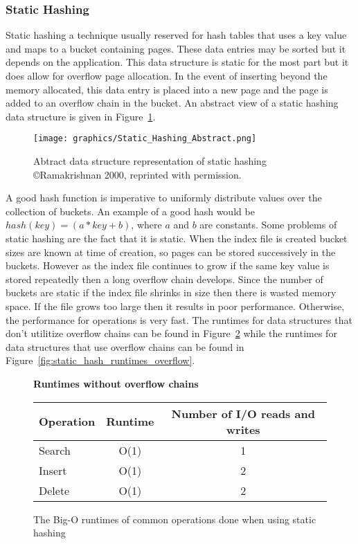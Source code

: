 \documentclass[letterpaper, 12pt]{article}
\begin{document}
\subsubsection{Static Hashing}
Static hashing a technique usually reserved for hash tables that uses a key value and maps to a bucket containing pages. These
data entries may be sorted but it depends on the application. This data structure is static
for the most part but it does allow for overflow page allocation. In the event of inserting
beyond the memory allocated, this data entry is placed into a new page and the page is added
to an overflow chain in the bucket. An abstract view of a static hashing data structure is given in 
Figure~\ref{fig:static_abstract}.
\par\vspace{\baselineskip}

\begin{figure}[H]
  \centering
  \texttt{[image: graphics/Static\_Hashing\_Abstract.png]}
  \caption{Abtract data structure representation of static hashing \newline \copyright Ramakrishnan 2000, 
  reprinted with permission.\cite{ramakrishnan2000database}}
  \label{fig:static_abstract}
\end{figure}

A good hash function is imperative to uniformly distribute values over the collection of buckets.
An example of a good hash would be $hash(key) = (a*key + b)$, where $a$ and $b$ are constants. Some problems
of static hashing are the fact that it is static. When the index file is created bucket sizes
are known at time of creation, so pages can be stored successively in the buckets. However
as the index file continues to grow if the same key value is stored repeatedly then a long
overflow chain develops. Since the number of buckets are static if the index file shrinks
in size then there is wasted memory space. If the file grows too large then it results in
poor performance. Otherwise, the performance for operations is very fast. The runtimes
for data structures that don't utilitize overflow chains can be found in Figure~\ref{fig:static_hash_runtimes}
while the runtimes for data structures that use overflow chains can be found in
Figure~\ref{fig:static_hash_runtimes_overflow}.
\par\vspace{\baselineskip}

\begin{figure}[H]
\centering
\textbf{Runtimes without overflow chains}
\begin{tabular}{l | c | c}
  \hline
  Operation & Runtime & Number of I/O reads and writes \\ \hline \hline
  Search & O(1) & 1  \\ \hline
  Insert & O(1) & 2  \\ \hline
  Delete & O(1) & 2  \\ \hline
\end{tabular}
\caption{The Big-O runtimes of common operations done when using static hashing}
\label{fig:static_hash_runtimes}
\end{figure}
\end{document}
